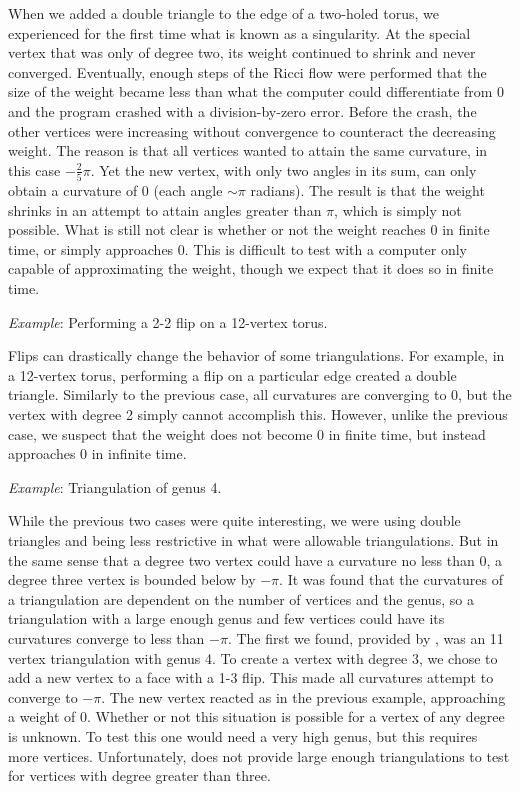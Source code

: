 \documentclass[12pt]{article}
\begin{document}
 When we added a double triangle to the edge of a two-holed torus, we experienced for the first time what is known as a singularity. At the special vertex that was only of degree two, its weight continued to shrink and never converged. Eventually, enough steps of the Ricci flow were performed that the size of the weight became less than what the computer could differentiate from 0 and the program crashed with a division-by-zero error. Before the crash, the other vertices were increasing without convergence to counteract the decreasing weight. The reason is that all vertices wanted to attain the same curvature, in this case $-\frac{2}{5}\pi$. Yet the new vertex, with only two angles in its sum, can only obtain a curvature of 0 (each angle $\sim\pi$ radians). The result is that the weight shrinks in an attempt to attain angles greater than $\pi$, which is simply not possible. What is still not clear is whether or not the weight reaches 0 in finite time, or simply approaches 0. This is difficult to test with a computer only capable of approximating the weight, though we expect that it does so in finite time.

 \textit{Example}: Performing a 2-2 flip on a 12-vertex torus. 

 Flips can drastically change the behavior of some triangulations. For example, in a 12-vertex torus, performing a flip on a particular edge created a double triangle. Similarly to the previous case, all curvatures are converging to 0, but the vertex with degree 2 simply cannot accomplish this. However, unlike the previous case, we suspect that the weight does not become 0 in finite time, but instead approaches 0 in infinite time.

 \textit{Example}: Triangulation of genus 4.

 While the previous two cases were quite interesting, we were using double triangles and being less restrictive in what were allowable triangulations. But in the same sense that a degree two vertex could have a curvature no less than 0, a degree three vertex is bounded below by $-\pi$. It was found that the curvatures of a triangulation are dependent on the number of vertices and the genus, so a triangulation with a large enough genus and few vertices could have its curvatures converge to less than $-\pi$. The first we found, provided by \cite{lutzmanifold}, was an 11 vertex triangulation with genus 4. To create a vertex with degree 3, we chose to add a new vertex to a face with a 1-3 flip. This made all curvatures attempt to converge to $-\pi$. The new vertex reacted as in the previous example, approaching a weight of 0. Whether or not this situation is possible for a vertex of any degree is unknown. To test this one would need a very high genus, but this requires more vertices. Unfortunately, \cite{lutzmanifold} does not provide large enough triangulations to test for vertices with degree greater than three.
\end{document}
